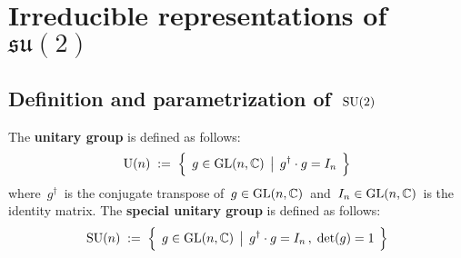 

\chapter{Irreducible representations of $\mathfrak{su}(2)$}
\setcounter{theorem}{0}
\setcounter{equation}{0}


\renewcommand{\theenumi}{\roman{enumi}}
\renewcommand{\labelenumi}{\textnormal{(\theenumi)}$\;\;$}


\section{Definition and parametrization of \,$\textnormal{SU}(2)$}


\begin{definition}
\mbox{}
\vskip 0.1cm
\noindent
The \textbf{unitary group} is defined as follows:
\begin{equation*}
\textnormal{U}(n)
\; := \;
	\left\{\;\,
		g \overset{{\color{white}.}}{\in} \textnormal{GL}(n,\C)
		\;\left\vert\;\,
			g^{\dagger} \cdot g = I_{n}
			\right.
		\;\right\}
\end{equation*}
where \,$g^{\dagger}$\, is the conjugate transpose of
\,$g \in \textnormal{GL}(n,\mathbb{C})$\,
and
\,$I_{n} \in \textnormal{GL}(n,\mathbb{C})$\,
is the identity matrix.
\vskip 0.1cm
\noindent
The \textbf{special unitary group} is defined as follows:
\begin{equation*}
\textnormal{SU}(n)
\; := \;
	\left\{\;\,
		g \overset{{\color{white}.}}{\in} \textnormal{GL}(n,\C)
		\;\left\vert\;\,
			g^{\dagger} \cdot g = I_{n}\,,
			\;
			\textnormal{det}(g) = 1
			\right.
		\;\right\}
\end{equation*}
\end{definition}

